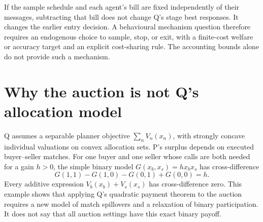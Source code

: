 \documentclass{article}
\begin{document}
If the sample schedule and each agent's bill are fixed independently of
their messages, subtracting that bill does not change Q's stage best
responses. It changes the earlier entry decision. A behavioural mechanism
question therefore requires an endogenous choice to sample, stop, or exit,
with a finite-cost welfare or accuracy target and an explicit cost-sharing
rule. The accounting bounds alone do not provide such a mechanism.

\section*{Why the auction is not Q's allocation model}
Q assumes a separable planner objective \(\sum_nV_n(x_n)\), with strongly
concave individual valuations on convex allocation sets. P's surplus
depends on executed buyer--seller matches. For one buyer and one seller
whose calls are both needed for a gain \(h>0\), the simple binary model
\(G(x_b,x_s)=h x_bx_s\) has cross-difference
\[
G(1,1)-G(1,0)-G(0,1)+G(0,0)=h.
\]
Every additive expression \(V_b(x_b)+V_s(x_s)\) has cross-difference zero.
This example shows that applying Q's quadratic payment theorem to the
auction requires a new model of match spillovers and a relaxation of binary
participation. It does not say that all auction settings have this exact
binary payoff.
\end{document}
